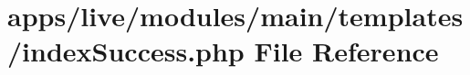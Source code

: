 \hypertarget{live_2modules_2main_2templates_2index_success_8php}{\section{apps/live/modules/main/templates/index\-Success.php File Reference}
\label{live_2modules_2main_2templates_2index_success_8php}
}
